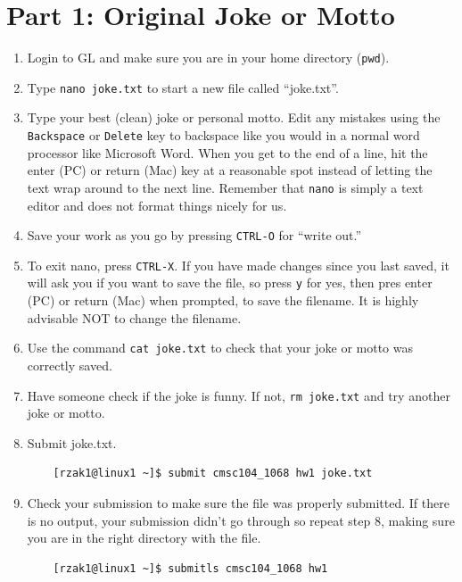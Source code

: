 \documentclass[letter,11pt]{article}
\begin{document}
\section*{Part 1: Original Joke or Motto}
\begin{enumerate}
    \item Login to GL and make sure you are in your home directory (\texttt{pwd}).
    \item Type \texttt{nano joke.txt} to start a new file called ``joke.txt''.
    \item Type your best (clean) joke or personal motto. Edit any mistakes using the \texttt{Backspace} or \texttt{Delete} key to backspace like you would in a normal word processor like Microsoft Word. When you get to the end of a line, hit the enter (PC) or return (Mac) key at a reasonable spot instead of letting the text wrap around to the next line. Remember that \texttt{nano} is simply a text editor and does not format things nicely for us.
    \item Save your work as you go by pressing \texttt{CTRL-O} for ``write out.''
    \item To exit nano, press \texttt{CTRL-X}. If you have made changes since you last saved, it will ask you if you want to save the file, so press \texttt{y} for yes, then pres enter (PC) or return (Mac) when prompted, to save the filename. It is highly advisable NOT to change the filename.
    \item Use the command \texttt{cat joke.txt} to check that your joke or motto was correctly saved.
    \item Have someone check if the joke is funny. If not, \texttt{rm joke.txt} and try another joke or motto.
    \item Submit joke.txt.
    \begin{verbatim}
    [rzak1@linux1 ~]$ submit cmsc104_1068 hw1 joke.txt
    \end{verbatim}
    \item Check your submission to make sure the file was properly submitted. If there is no output, your submission didn’t go through so repeat step 8, making sure you are in the right directory with the file.
    \begin{verbatim}
    [rzak1@linux1 ~]$ submitls cmsc104_1068 hw1
    \end{verbatim}
\end{enumerate}
\end{document}
